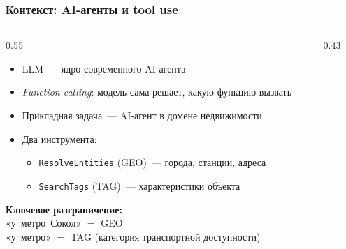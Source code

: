 \documentclass[aspectratio=169]{beamer}
\begin{document}
\begin{frame}
\frametitle{Контекст: AI-агенты и tool use}
\begin{columns}[T]
\begin{column}{0.55\textwidth}
\begin{itemize}
  \item LLM~— ядро современного AI-агента
  \item \textit{Function calling}: модель сама решает, какую функцию вызвать
  \item Прикладная задача~— AI-агент в домене недвижимости
  \item Два инструмента:
    \begin{itemize}
      \item \texttt{ResolveEntities} (GEO)~— города, станции, адреса
      \item \texttt{SearchTags} (TAG)~— характеристики объекта
    \end{itemize}
\end{itemize}

\vspace{0.6em}
\textbf{Ключевое разграничение:}\\
«у~метро~Сокол» $=$ GEO\\
«у~метро» $=$ TAG (категория транспортной доступности)
\end{column}
\begin{column}{0.43\textwidth}
\begin{center}
\end{center}
\end{column}
\end{columns}
\end{frame}
\end{document}
